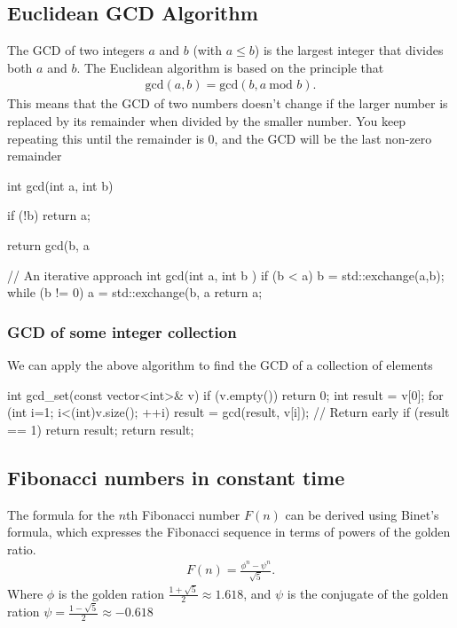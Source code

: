 \documentclass{report}
\begin{document}
\subsection{Euclidean GCD Algorithm}
\bigbreak \noindent 
The GCD of two integers $a$ and $b$ (with $a \leq b$) is the largest integer that divides both $a$ and $b$. The Euclidean algorithm is based on the principle that
\begin{align*}
    \text{gcd}(a,b) = \text{gcd}(b, a\ \text{mod } b)
.\end{align*}
\bigbreak \noindent 
This means that the GCD of two numbers doesn't change if the larger number is replaced by its remainder when divided by the smaller number. You keep repeating this until the remainder is 0, and the GCD will be the last non-zero remainder
\bigbreak \noindent 
\begin{cppcode}
    int gcd(int a, int b)  {
        if (!b) return a;

        return gcd(b, a%
    }
    // An iterative approach
    int gcd(int a, int b ) {
        if (b < a) {
            b = std::exchange(a,b);
        }
        while (b != 0) {
            a = std::exchange(b, a %
        }
        return a;
    }
\end{cppcode}
\bigbreak \noindent 
\subsubsection{GCD of some integer collection}
\bigbreak \noindent 
We can apply the above algorithm to find the GCD of a collection of elements
\bigbreak \noindent 
\begin{cppcode}
    int gcd_set(const vector<int>& v) {
        if (v.empty()) return 0;
        int result = v[0];
        for (int i=1; i<(int)v.size(); ++i) {
            result = gcd(result, v[i]);
            // Return early
            if (result == 1) return result;
        }
        return result;
    }
\end{cppcode}

\bigbreak \noindent 
\subsection{Fibonacci numbers in constant time}
\bigbreak \noindent 
The formula for the $n$th Fibonacci number $F(n)$ can be derived using Binet's formula, which expresses the Fibonacci sequence in terms of powers of the golden ratio.
\begin{align*}
    F(n) = \frac{\phi^{n} - \psi^{n}}{\sqrt{5}}
.\end{align*}
Where $\phi$ is the golden ration $\frac{1+\sqrt{5}}{2} \approx 1.618 $, and $\psi$ is the conjugate of the golden ration $\psi = \frac{1- \sqrt{5}}{2} \approx -0.618 $
\end{document}
